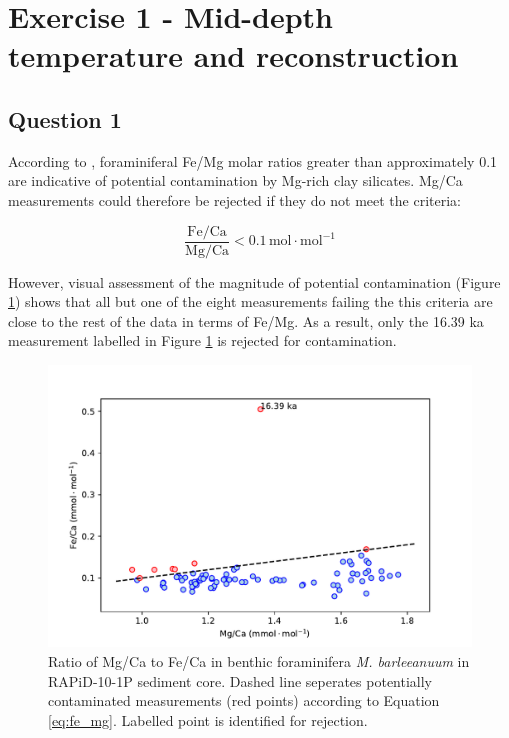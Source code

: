 \section{Exercise 1 - Mid-depth temperature and  reconstruction}

\subsection{Question 1}
According to \citeauthor{barker2003study} \parencite{barker2003study}, foraminiferal Fe/Mg molar ratios greater than approximately 0.1 are indicative of potential contamination by Mg-rich clay silicates.
Mg/Ca measurements could therefore be rejected if they do not meet the criteria:

\begin{equation} \label{eq:fe_mg}
    \frac{\mathrm{Fe}/\mathrm{Ca}}{\mathrm{Mg}/\mathrm{Ca}} < 0.1 \, \mathrm{mol \cdot mol^{-1}}
\end{equation}

However, visual assessment of the magnitude of potential contamination (Figure \ref{fig:Mg_Fe}) shows that all but one of the eight measurements failing the this criteria are close to the rest of the data in terms of Fe/Mg.
As a result, only the 16.39 ka measurement labelled in Figure \ref{fig:Mg_Fe} is rejected for contamination.

\begin{figure}[h]
\includegraphics[width=\textwidth]{img/scatter_MgCa_x_FeCa_contaminated.pdf}
    \caption{Ratio of Mg/Ca to Fe/Ca in benthic foraminifera \emph{M. barleeanuum} in RAPiD-10-1P sediment core.
             Dashed line seperates potentially contaminated measurements (red points) according to Equation \ref{eq:fe_mg}.
             Labelled point is identified for rejection.}
        \label{fig:Mg_Fe}
\end{figure}

